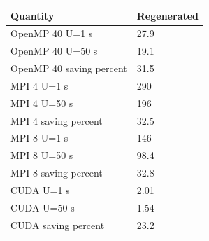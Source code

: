 \begin{tabular}{ll}
Quantity & Regenerated \\
\hline
OpenMP 40 U=1 s & 27.9 \\
OpenMP 40 U=50 s & 19.1 \\
OpenMP 40 saving percent & 31.5 \\
MPI 4 U=1 s & 290 \\
MPI 4 U=50 s & 196 \\
MPI 4 saving percent & 32.5 \\
MPI 8 U=1 s & 146 \\
MPI 8 U=50 s & 98.4 \\
MPI 8 saving percent & 32.8 \\
CUDA U=1 s & 2.01 \\
CUDA U=50 s & 1.54 \\
CUDA saving percent & 23.2 \\
\end{tabular}
